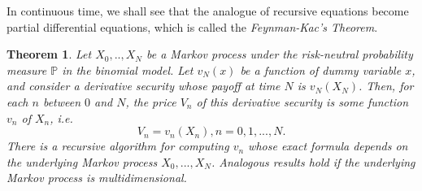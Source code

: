 \documentclass[a4paper]{article}
\newtheorem{thm}{Theorem}
\begin{document}
In continuous time, we shall see that the analogue of recursive equations become partial differential equations, which is called the \textit{Feynman-Kac's Theorem}.
\begin{thm}
Let $X_0,..,X_N$ be a Markov process under the risk-neutral probability measure $\mathbb{P}$ in the binomial model. Let $v_N(x)$ be a function of dummy variable $x$, and consider a derivative security whose payoff at time $N$ is $v_N(X_N)$. Then, for each $n$ between $0$ and $N$, the price $V_n$ of this derivative security is some function $v_n$ of $X_n$, i.e.
$$V_n=v_n(X_n), n=0,1,...,N.$$
There is a recursive algorithm for computing $v_n$ whose exact formula depends on the underlying Markov process $X_0,...,X_N$. Analogous results hold if the underlying Markov process is multidimensional. 
\end{thm}
\end{document}
